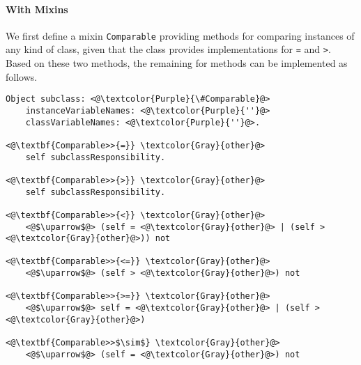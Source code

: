 \documentclass[12pt]{article}
\begin{document}
\paragraph{With Mixins}
We first define a mixin \texttt{Comparable} providing methods for comparing instances of any kind of class, given that the class provides implementations for \texttt{=} and \texttt{>}. Based on these two methods, the remaining for methods can be implemented as follows.
\begin{lstlisting}
Object subclass: <@\textcolor{Purple}{\#Comparable}@>
    instanceVariableNames: <@\textcolor{Purple}{''}@>
    classVariableNames: <@\textcolor{Purple}{''}@>.
    
<@\textbf{Comparable>>{=}} \textcolor{Gray}{other}@>
    self subclassResponsibility.
    
<@\textbf{Comparable>>{>}} \textcolor{Gray}{other}@>
    self subclassResponsibility.
    
<@\textbf{Comparable>>{<}} \textcolor{Gray}{other}@>
    <@$\uparrow$@> (self = <@\textcolor{Gray}{other}@> | (self > <@\textcolor{Gray}{other}@>)) not
    
<@\textbf{Comparable>>{<=}} \textcolor{Gray}{other}@>
    <@$\uparrow$@> (self > <@\textcolor{Gray}{other}@>) not
    
<@\textbf{Comparable>>{>=}} \textcolor{Gray}{other}@>
    <@$\uparrow$@> self = <@\textcolor{Gray}{other}@> | (self > <@\textcolor{Gray}{other}@>)
    
<@\textbf{Comparable>>$\sim$} \textcolor{Gray}{other}@>
    <@$\uparrow$@> (self = <@\textcolor{Gray}{other}@>) not
\end{lstlisting}
\end{document}
